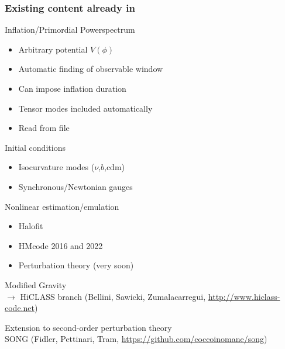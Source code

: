 \begin{frame}[fragile]
	\frametitle{Existing content already in \CLASS{}}
	
	\pause
	Inflation/Primordial Powerspectrum
	\begin{itemize}
		\item Arbitrary potential $V(\phi)$
		\item Automatic finding of observable window
		\item Can impose inflation duration
		\item Tensor modes included automatically
		\item Read from file
	\end{itemize}

	\pause
	Initial conditions
	\begin{itemize}
		\item Isocurvature modes ($\nu$,$b$,$\mathrm{cdm}$)
		\item Synchronous/Newtonian gauges
	\end{itemize}

	\pause
	Nonlinear estimation/emulation
	\begin{itemize}
	\item Halofit
	\item HMcode 2016 and 2022
	\item Perturbation theory (very soon)
	\end{itemize}

	\pause
	Modified Gravity\\
	$\to$ {\Red HiCLASS} branch (Bellini, Sawicki, Zumalacarregui, \url{http://www.hiclass-code.net})
	
	\vspace*{0.5\baselineskip}
	\pause
	Extension to {\Red second-order perturbation theory}\\ SONG (Fidler, Pettinari, Tram, \url{https://github.com/coccoinomane/song})
\end{frame}

